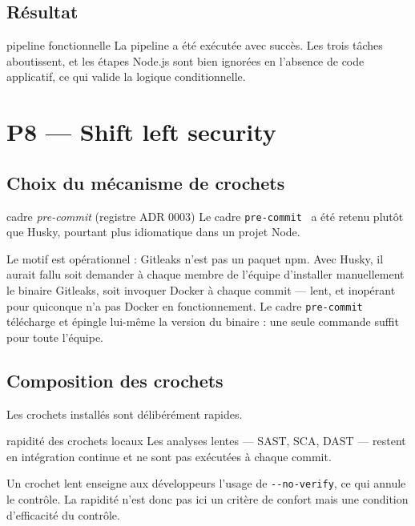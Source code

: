 \subsection{Résultat}

\begin{verification}{pipeline fonctionnelle}
La pipeline a été exécutée avec succès. Les trois tâches aboutissent, et les
étapes Node.js sont bien ignorées en l'absence de code applicatif, ce qui valide
la logique conditionnelle.
\end{verification}


\section{P8 --- Shift left security}
\label{sec:shift-left}

\subsection{Choix du mécanisme de crochets}

\begin{decision}{cadre \emph{pre-commit} (registre ADR 0003)}
Le cadre \texttt{pre-commit}~\cite{precommit} a été retenu plutôt que Husky,
pourtant plus idiomatique dans un projet Node.

Le motif est opérationnel : Gitleaks n'est pas un paquet npm. Avec Husky, il
aurait fallu soit demander à chaque membre de l'équipe d'installer manuellement
le binaire Gitleaks, soit invoquer Docker à chaque commit --- lent, et
inopérant pour quiconque n'a pas Docker en fonctionnement. Le cadre
\texttt{pre-commit} télécharge et épingle lui-même la version du binaire : une
seule commande suffit pour toute l'équipe.
\end{decision}

\subsection{Composition des crochets}

Les crochets installés sont délibérément rapides.

\begin{decision}{rapidité des crochets locaux}
Les analyses lentes --- SAST, SCA, DAST --- restent en intégration continue et
ne sont pas exécutées à chaque commit.

Un crochet lent enseigne aux développeurs l'usage de \texttt{-{}-no-verify}, ce
qui annule le contrôle. La rapidité n'est donc pas ici un critère de confort
mais une condition d'efficacité du contrôle.
\end{decision}

